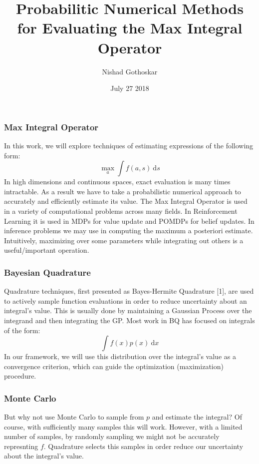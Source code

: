 \documentclass[9pt]{beamer}
\title{Probabilitic Numerical Methods for Evaluating the Max Integral Operator}
\author{Nishad Gothoskar}
\institute{Learning and Intelligent Systems}
\date{July 27 2018}
\begin{document}
 
\frame{\titlepage}
 
\begin{frame}
\frametitle{Max Integral Operator}
In this work, we will explore techniques of estimating expressions of the following form:
\begin{equation*}
    \max_{a} \int f(a,s) \ \text{d}s
\end{equation*}
In high dimensions and continuous spaces, exact evaluation is many times intractable. As a result we have to take a probabilistic numerical approach to accurately and efficiently estimate its value.
\newline \newline
The Max Integral Operator is used in a variety of computational problems across many fields. In Reinforcement Learning it is used in MDPs for value update and POMDPs for belief updates. In inference problems we may use in computing the maximum a posteriori estimate.\newline \newline
Intuitively, maximizing over some parameters while integrating out others is a useful/important operation.
\end{frame}

\begin{frame}
\frametitle{Bayesian Quadrature}
Quadrature techniques, first presented as Bayes-Hermite Quadrature [1], are used to actively sample function evaluations in order to reduce uncertainty about an integral's value. This is usually done by maintaining a Gaussian Process over the integrand and then integrating the GP. 
\newline\newline
Most work in BQ has focused on integrals of the form:
\begin{equation*}
   \int f(x) p(x)  \ \text{d}x
\end{equation*}
In our framework, we will use this distribution over the integral's value as a convergence criterion, which can guide the optimization (maximization) procedure.
\end{frame}

\begin{frame}
\frametitle{Monte Carlo}
But why not use Monte Carlo to sample from $p$ and estimate the integral?
\newline\newline
Of course, with sufficiently many samples this will work. However, with a limited number of samples, by randomly sampling we might not be accurately represnting $f$. Quadrature selects this samples in order reduce our uncertainty about the integral's value.
\end{frame}
\end{document}
